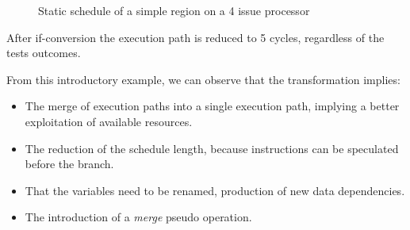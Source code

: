 \begin{figure}
\vspace{1cm}
\caption{Static schedule of a simple region on a 4 issue processor}
\label{fig:example1}
\end{figure}

After if-conversion the execution path is reduced to 5 cycles, regardless of the tests outcomes.

From this introductory example, we can observe that the transformation implies:

\begin{itemize}
\item The merge of execution paths into a single execution path, implying a  better exploitation of available resources.  
\item The reduction of the schedule length, because instructions can be speculated before the branch.
\item That the variables need to be renamed, production of new data dependencies.
\item The introduction of a \textit{merge} pseudo operation.
\end{itemize}

